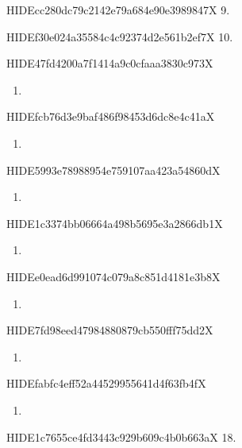 \documentclass[
  ukrainian,
]{article}
\providecommand{\tightlist}{%
  \setlength{\itemsep}{0pt}\setlength{\parskip}{0pt}}
\begin{document}
HIDEcc280dc79c2142e79a684e90e3989847X 9.

HIDEf30e024a35584c4c92374d2e561b2ef7X 10.

HIDE47fd4200a7f1414a9c0cfaaa3830c973X

\begin{enumerate}
\def\labelenumi{\arabic{enumi}.}
\setcounter{enumi}{10}
\tightlist
\item
\end{enumerate}

HIDEfcb76d3e9baf486f98453d6dc8e4c41aX

\begin{enumerate}
\def\labelenumi{\arabic{enumi}.}
\setcounter{enumi}{11}
\tightlist
\item
\end{enumerate}

HIDE5993e78988954e759107aa423a54860dX

\begin{enumerate}
\def\labelenumi{\arabic{enumi}.}
\setcounter{enumi}{12}
\tightlist
\item
\end{enumerate}

HIDE1c3374bb06664a498b5695e3a2866db1X

\begin{enumerate}
\def\labelenumi{\arabic{enumi}.}
\setcounter{enumi}{13}
\tightlist
\item
\end{enumerate}

HIDEe0ead6d991074c079a8c851d4181e3b8X

\begin{enumerate}
\def\labelenumi{\arabic{enumi}.}
\setcounter{enumi}{14}
\tightlist
\item
\end{enumerate}

HIDE7fd98eed47984880879cb550fff75dd2X

\begin{enumerate}
\def\labelenumi{\arabic{enumi}.}
\setcounter{enumi}{15}
\tightlist
\item
\end{enumerate}

HIDEfabfc4eff52a44529955641d4f63fb4fX

\begin{enumerate}
\def\labelenumi{\arabic{enumi}.}
\setcounter{enumi}{16}
\tightlist
\item
\end{enumerate}

HIDE1c7655ce4fd3443c929b609c4b0b663aX 18.
\end{document}
